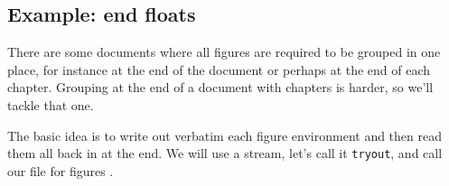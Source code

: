 {{{{\begin{comment}
    We have the pieces ready, and all that remains is to define
the \cs{enote} macro, which will take one argument --- the text of the
note.
\begin{lcode}
\newcommand{\enote}[1]{%
  \refstepcounter{enote}%
  \textsuperscript{\theenote}%
  \ifnum\value{savechap}=\value{chapter}\else %
    \setcounter{savechap}{\value{chapter}%
    \addtostream{notesout}{\enotehead{\thechapter}}%
  \fi
  \addtostream{notesout}{\enotetext{\theenote}{#1}}}
\end{lcode}
\cs{enote}, which is used just like \cmd{\footnote}, increments the 
counter for endnotes, typesets that as a superscript, and then writes
the \cs{enotetext} command to the endnotes file. Entries in the \pixfile{ent}
file will look like:
\begin{lcode}
...
\enotehead{3}     %
\enotetext{1}{First end note in chapter 3.}
\enotetext{2}{The next end note.}
...
\end{lcode}

    You can try this, perhaps changing the definition of \cs{enotetext}
to give a better looking presentation of an endnote. There is, however,
a caveat if you use \cs{enote}. 

\vspace{\onelineskip}
\noindent\textbf{Question 3.} What is the caveat?

If you can't
think what it might be, don't worry as it will be dealt with in another
example. 

\index{endnotes|)}
\end{comment}

\subsection{Example: end floats}


    There are some documents where all figures are required to be grouped
in one place, for instance at the end of the document or perhaps at the
end of each chapter. Grouping at the end of a document with 
chapters is harder, so we'll tackle that one.

   The basic idea is to write out verbatim 
each figure environment and then read them all back in at the end. 
We will use a stream, let's call
it \texttt{tryout}, and call our file for figures .
\begin{lcode}
\end{lcode}

}}}}
